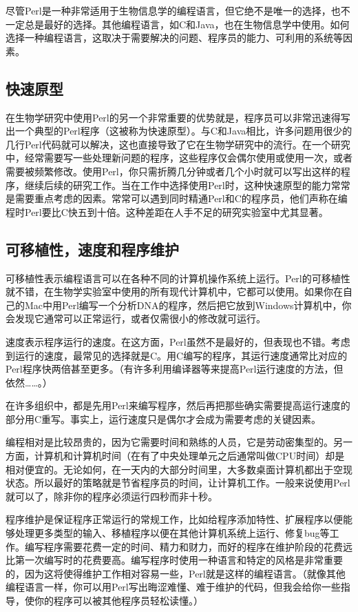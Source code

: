 尽管Perl是一种非常适用于生物信息学的编程语言，但它绝不是唯一的选择，也不一定总是最好的选择。其他编程语言，如C和Java，也在生物信息学中使用。如何选择一种编程语言，这取决于需要解决的问题、程序员的能力、可利用的系统等因素。

\subsection{快速原型}
在生物学研究中使用Perl的另一个非常重要的优势就是，程序员可以非常迅速得写出一个典型的Perl程序（这被称为快速原型）。与C和Java相比，许多问题用很少的几行Perl代码就可以解决，这也直接导致了它在生物学研究中的流行。在一个研究中，经常需要写一些处理新问题的程序，这些程序仅会偶尔使用或使用一次，或者需要被频繁修改。使用Perl，你只需折腾几分钟或者几个小时就可以写出这样的程序，继续后续的研究工作。当在工作中选择使用Perl时，这种快速原型的能力常常是需要重点考虑的因素。常常可以遇到同时精通Perl和C的程序员，他们声称在编程时Perl要比C快五到十倍。这种差距在人手不足的研究实验室中尤其显著。

\subsection{可移植性，速度和程序维护}
可移植性表示编程语言可以在各种不同的计算机操作系统上运行。Perl的可移植性就不错，在生物学实验室中使用的所有现代计算机中，它都可以使用。如果你在自己的Mac中用Perl编写一个分析DNA的程序，然后把它放到Windows计算机中，你会发现它通常可以正常运行，或者仅需很小的修改就可运行。

速度表示程序运行的速度。在这方面，Perl虽然不是最好的，但表现也不错。考虑到运行的速度，最常见的选择就是C。用C编写的程序，其运行速度通常比对应的Perl程序快两倍甚至更多。（有许多利用编译器等来提高Perl运行速度的方法，但依然……。）

在许多组织中，都是先用Perl来编写程序，然后再把那些确实需要提高运行速度的部分用C重写。事实上，运行速度只是偶尔才会成为需要考虑的关键因素。

编程相对是比较昂贵的，因为它需要时间和熟练的人员，它是劳动密集型的。另一方面，计算机和计算机时间（在有了中央处理单元之后通常叫做CPU时间）却是相对便宜的。无论如何，在一天内的大部分时间里，大多数桌面计算机都出于空现状态。所以最好的策略就是节省程序员的时间，让计算机工作。一般来说使用Perl就可以了，除非你的程序必须运行四秒而非十秒。

程序维护是保证程序正常运行的常规工作，比如给程序添加特性、扩展程序以便能够处理更多类型的输入、移植程序以便在其他计算机系统上运行、修复bug等工作。编写程序需要花费一定的时间、精力和财力，而好的程序在维护阶段的花费远比第一次编写时的花费要高。编写程序时使用一种语言和特定的风格是非常重要的，因为这将使得维护工作相对容易一些，Perl就是这样的编程语言。（就像其他编程语言一样，你可以用Perl写出晦涩难懂、难于维护的代码，但我会给你一些指导，使你的程序可以被其他程序员轻松读懂。）

